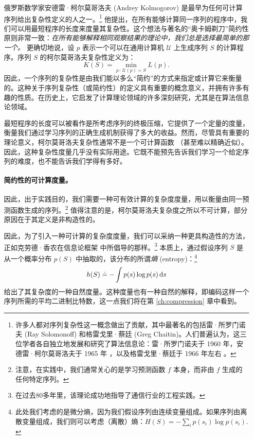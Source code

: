 \documentclass[../../book-main.tex]{subfiles}
\begin{document}
俄罗斯数学家安德雷·柯尔莫哥洛夫 (Andrey Kolmogorov) 是最早为任何可计算序列给出复杂性定义的人之一。\footnote{许多人都对序列复杂性这一概念做出了贡献，其中最著名的包括雷·所罗门诺夫 (Ray Solomonoff) 和格雷戈里·蔡廷 (Greg Chaitin)。人们普遍认为，这三位学者各自独立地发展和研究了算法信息论：雷·所罗门诺夫于 1960 年，安德雷·柯尔莫哥洛夫于 1965 年 \cite{Kolmogorov1998OnTO}，以及格雷戈里·蔡廷于 1966 年左右 \cite{Chaitin-1966}。} 他提出，在所有能够计算同一序列的程序中，我们可以用最短程序的长度来度量其复杂性。这个想法与著名的“奥卡姆剃刀”简约性原则非常一致：{\em 在所有能够解释相同观察结果的理论中，我们总是选择最简单的那一个。} 更确切地说，设 $p$ 表示一个可以在通用计算机 $\mathcal{U}$ 上生成序列 $S$ 的计算程序。序列 $S$ 的柯尔莫哥洛夫复杂性定义为：
\begin{equation}
    K(S) = \min_{p\,:\, \mathcal{U}(p) = S} L(p). 
\end{equation}
因此，一个序列的复杂性是由我们能以多么“简约”的方式来指定或计算它来衡量的。这种关于序列复杂性（或简约性）的定义具有重要的概念意义，并拥有许多有趣的性质。在历史上，它启发了计算理论领域的许多深刻研究，尤其是在算法信息论领域。

最短程序的长度可以被看作是所考虑序列的终极压缩，它提供了一个定量的度量，衡量我们通过学习序列的正确生成机制获得了多大的收益。然而，尽管具有重要的理论意义，柯尔莫哥洛夫复杂性通常不是一个可计算函数 \cite{Cover-Thomas}（甚至难以精确近似）。因此，这种复杂性度量几乎没有实际用途。它既不能预先告诉我们学习一个给定序列的难度，也不能告诉我们学得有多好。






\paragraph{简约性的可计算度量。}

因此，出于实践目的，我们需要一种可有效计算的复杂度度量，用以衡量由同一预测函数生成的序列。\footnote{注意，在实践中，我们通常关心的是学习预测函数 $f$ 本身，而非由 $f$ 生成的任何特定序列。} 值得注意的是，柯尔莫哥洛夫复杂度之所以不可计算，部分原因在于其定义是非构造性的。

因此，为了引入一种可计算的复杂度度量，我们可以采纳一种更具构造性的方法，正如克劳德·香农在信息论框架 \cite{Shannon-1948,Cover-Thomas} 中所倡导的那样。\footnote{在过去80多年里，该理论成功地指导了通信行业的工程实践。} 本质上，通过假设序列 $S$ 是从一个概率分布 $p(S)$ 中抽取的，该分布的所谓{\em 熵} (entropy)：\footnote{此处我们考虑的是微分熵，因为我们假设序列由连续变量组成。如果序列由离散变量组成，我们则可以考虑（离散）熵：$H(S) = - \sum_{i}p(s_i) \log p(s_i).$}
\begin{equation}
    h(S) \doteq -\int p(s) \log p(s) \odif{s}
    \label{eqn:entropy-definition}
\end{equation}
给出了其复杂度的一种自然度量。这种度量也有一种自然的解释，即编码这样一个序列所需的平均二进制比特数，这一点我们将在第 \ref{ch:compression} 章中看到。
\end{document}
